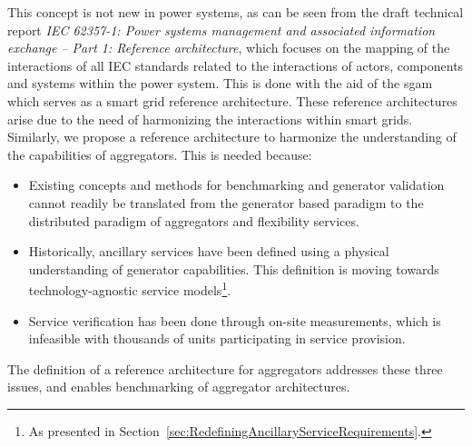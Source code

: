 This concept is not new in power systems, as can be seen from the draft technical report \emph{IEC 62357-1: Power systems management and associated information exchange -- Part 1: Reference architecture}, which focuses on the mapping of the interactions of all IEC standards related to the interactions of actors, components and systems within the power system. This is done with the aid of the \gls{sgam} which serves as a smart grid reference architecture. These reference architectures arise due to the need of harmonizing the interactions within smart grids. Similarly, we propose a reference architecture to harmonize the understanding of the capabilities of aggregators. This is needed because:
\begin{itemize}
	\item Existing concepts and methods for benchmarking and generator validation cannot readily be translated from the generator based paradigm to the distributed paradigm of aggregators and flexibility services.
	\item Historically, ancillary services have been defined using a physical understanding of generator capabilities. This definition is moving towards technology-agnostic service models\footnote{As presented in Section~\ref{sec:RedefiningAncillaryServiceRequirements}.}.
	\item Service verification has been done through on-site measurements, which is infeasible with thousands of units participating in service provision.
\end{itemize}

The definition of a reference architecture for aggregators addresses these three issues, and enables benchmarking of aggregator architectures.

